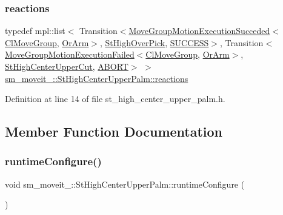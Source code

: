 \subsubsection{\texorpdfstring{reactions}{reactions}}
{\footnotesize\ttfamily typedef mpl\+::list$<$ Transition$<$\hyperlink{structmove__group__interface__client_1_1MoveGroupMotionExecutionSucceded}{Move\+Group\+Motion\+Execution\+Succeded}$<$\hyperlink{classmove__group__interface__client_1_1ClMoveGroup}{Cl\+Move\+Group}, \hyperlink{classsm__moveit__3_1_1OrArm}{Or\+Arm}$>$, \hyperlink{structsm__moveit__3_1_1StHighOverPick}{St\+High\+Over\+Pick}, \hyperlink{classSUCCESS}{S\+U\+C\+C\+E\+SS}$>$, Transition$<$\hyperlink{structmove__group__interface__client_1_1MoveGroupMotionExecutionFailed}{Move\+Group\+Motion\+Execution\+Failed}$<$\hyperlink{classmove__group__interface__client_1_1ClMoveGroup}{Cl\+Move\+Group}, \hyperlink{classsm__moveit__3_1_1OrArm}{Or\+Arm}$>$, \hyperlink{structsm__moveit__3_1_1StHighCenterUpperCut}{St\+High\+Center\+Upper\+Cut}, \hyperlink{classABORT}{A\+B\+O\+RT}$>$ $>$ \hyperlink{structsm__moveit__3_1_1StHighCenterUpperPalm_aad95efec300751f5b6021f941c660dbe}{sm\+\_\+moveit\+\_\+::\+St\+High\+Center\+Upper\+Palm\+::reactions}}



Definition at line 14 of file st\+\_\+high\+\_\+center\+\_\+upper\+\_\+palm.\+h.



\subsection{Member Function Documentation}
\mbox{\label{structsm__moveit__3_1_1StHighCenterUpperPalm_abe603caed1d44c662d4bf6e18159d828}} 
\subsubsection{\texorpdfstring{runtime\+Configure()}{runtimeConfigure()}}
{\footnotesize\ttfamily void sm\+\_\+moveit\+\_\+::\+St\+High\+Center\+Upper\+Palm\+::runtime\+Configure (\begin{DoxyParamCaption}{ }\end{DoxyParamCaption})\hspace{0.3cm}{\ttfamily [inline]}}



